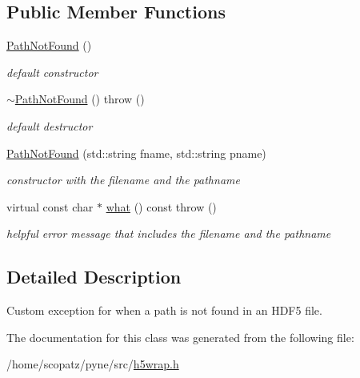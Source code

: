 \subsection*{Public Member Functions}
\begin{DoxyCompactItemize}
\item 
\hypertarget{classh5wrap_1_1_path_not_found_a7b05229fb4f02920732f22622af1f08e}{\hyperlink{classh5wrap_1_1_path_not_found_a7b05229fb4f02920732f22622af1f08e}{Path\-Not\-Found} ()}\label{classh5wrap_1_1_path_not_found_a7b05229fb4f02920732f22622af1f08e}

\begin{DoxyCompactList}\small\item\em default constructor \end{DoxyCompactList}\item 
\hypertarget{classh5wrap_1_1_path_not_found_acf9696ccdfb4a4c63454dbfc1dcde060}{\hyperlink{classh5wrap_1_1_path_not_found_acf9696ccdfb4a4c63454dbfc1dcde060}{$\sim$\-Path\-Not\-Found} ()  throw ()}\label{classh5wrap_1_1_path_not_found_acf9696ccdfb4a4c63454dbfc1dcde060}

\begin{DoxyCompactList}\small\item\em default destructor \end{DoxyCompactList}\item 
\hypertarget{classh5wrap_1_1_path_not_found_aaedd26703acced17206eb8dabd4c5274}{\hyperlink{classh5wrap_1_1_path_not_found_aaedd26703acced17206eb8dabd4c5274}{Path\-Not\-Found} (std\-::string fname, std\-::string pname)}\label{classh5wrap_1_1_path_not_found_aaedd26703acced17206eb8dabd4c5274}

\begin{DoxyCompactList}\small\item\em constructor with the filename and the pathname \end{DoxyCompactList}\item 
\hypertarget{classh5wrap_1_1_path_not_found_ad454d14e0f9f44f4357a5c33a7017b88}{virtual const char $\ast$ \hyperlink{classh5wrap_1_1_path_not_found_ad454d14e0f9f44f4357a5c33a7017b88}{what} () const   throw ()}\label{classh5wrap_1_1_path_not_found_ad454d14e0f9f44f4357a5c33a7017b88}

\begin{DoxyCompactList}\small\item\em helpful error message that includes the filename and the pathname \end{DoxyCompactList}\end{DoxyCompactItemize}


\subsection{Detailed Description}
Custom exception for when a path is not found in an H\-D\-F5 file. 

The documentation for this class was generated from the following file\-:\begin{DoxyCompactItemize}
\item 
/home/scopatz/pyne/src/\hyperlink{h5wrap_8h}{h5wrap.\-h}\end{DoxyCompactItemize}
